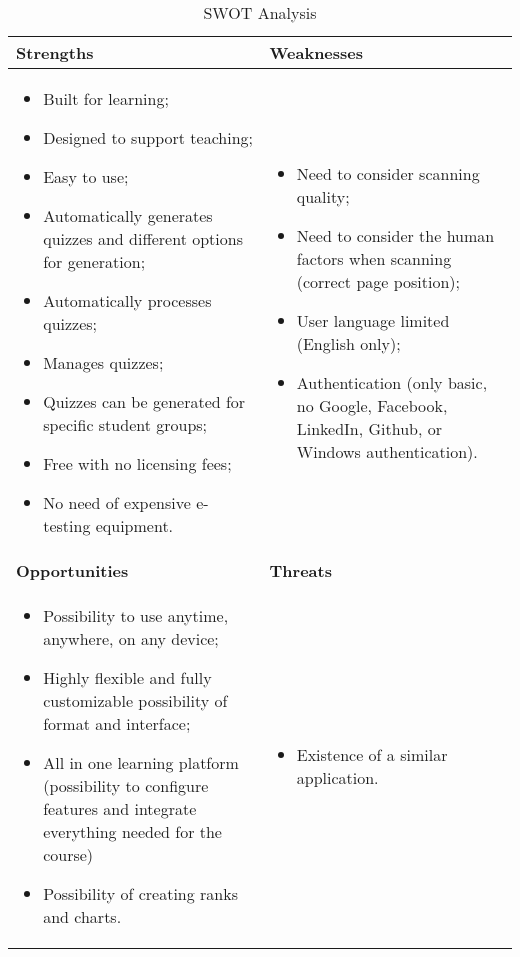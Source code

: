\begin{table}[ht!]
\centering
\caption{SWOT Analysis}
{
  \begin{tabular}{p{8cm}p{8cm}}
    \bfseries Strengths &\bfseries Weaknesses  \\ \hline 
    {\parbox{0.4\textwidth}{
      \begin{itemize}                  
        \item Built for learning;  
        \item Designed to support teaching; 
        \item Easy to use;  
        \item Automatically generates quizzes and different options for generation;
        \item Automatically processes quizzes;
        \item Manages quizzes;
        \item Quizzes can be generated for specific student groups;
        \item Free with no licensing fees;
        \item No need of expensive e-testing equipment.            
      \end{itemize} }} &
    {\parbox{0.4\textwidth}{
      \begin{itemize}                      
        \item Need to consider scanning quality; 
        \item Need to consider the human factors when scanning (correct page position); 
        \item User language limited (English only);            
        \item Authentication (only basic, no Google, Facebook, LinkedIn, Github, or Windows authentication).
      \end{itemize} }} \\
    \bfseries Opportunities &\bfseries Threats  \\ \hline 
    {\parbox{0.4\textwidth}{
      \begin{itemize}                    
        \item     Possibility to use anytime, anywhere, on any device;
        \item     Highly flexible and fully customizable possibility of format and interface;
        \item     All in one learning platform (possibility to configure features and integrate everything needed for the course)
        \item     Possibility of creating ranks and charts.             
        \end{itemize} }} &
    {\parbox{0.4\textwidth}{
      \begin{itemize}     
        \setlength{\itemsep}{2pt}
        \setlength{\parskip}{1pt}                 
        \item Existence of a similar application.       
      \end{itemize} }}
   \end{tabular}
}
\label{swot_analysis}
\end{table}

